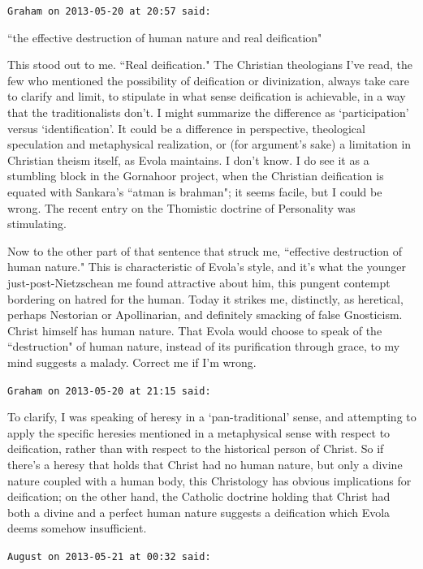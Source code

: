 \begin{footnotesize}
\begin{sffamily}
\hfill

\texttt{Graham on 2013-05-20 at 20:57 said: }

``the effective destruction of human nature and real deification"

This stood out to me. ``Real deification." The Christian theologians I've read, the few who mentioned the possibility of deification or divinization, always take care to clarify and limit, to stipulate in what sense deification is achievable, in a way that the traditionalists don't. I might summarize the difference as `participation' versus `identification'. It could be a difference in perspective, theological speculation and metaphysical realization, or (for argument's sake) a limitation in Christian theism itself, as Evola maintains. I don't know. I do see it as a stumbling block in the Gornahoor project, when the Christian deification is equated with Sankara's ``atman is brahman"; it seems facile, but I could be wrong. The recent entry on the Thomistic doctrine of Personality was stimulating.

Now to the other part of that sentence that struck me, ``effective destruction of human nature." This is characteristic of Evola's style, and it's what the younger just-post-Nietzschean me found attractive about him, this pungent contempt bordering on hatred for the human. Today it strikes me, distinctly, as heretical, perhaps Nestorian or Apollinarian, and definitely smacking of false Gnosticism. Christ himself has human nature. That Evola would choose to speak of the ``destruction" of human nature, instead of its purification through grace, to my mind suggests a malady. Correct me if I'm wrong.


\hfill

\texttt{Graham on 2013-05-20 at 21:15 said: }

To clarify, I was speaking of heresy in a `pan-traditional' sense, and attempting to apply the specific heresies mentioned in a metaphysical sense with respect to deification, rather than with respect to the historical person of Christ. So if there's a heresy that holds that Christ had no human nature, but only a divine nature coupled with a human body, this Christology has obvious implications for deification; on the other hand, the Catholic doctrine holding that Christ had both a divine and a perfect human nature suggests a deification which Evola deems somehow insufficient.


\hfill

\texttt{August on 2013-05-21 at 00:32 said: }


\end{sffamily}
\end{footnotesize}
